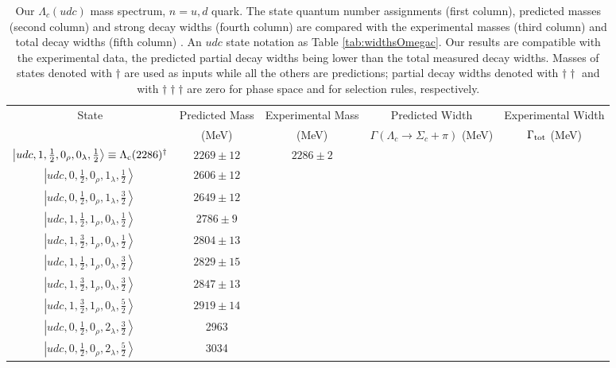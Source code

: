 \documentclass[twocolumn,superscriptaddress,preprintnumbers,nofootinbib]{revtex4}
\begin{document}
\begin{table*}[htbp]
\caption{Our $\Lambda_c (udc)$ mass spectrum, $n=u,d$ quark. The  state quantum number assignments (first column), predicted masses (second column) and strong decay widths (fourth column) are compared with the  experimental  masses (third column) and total decay widths (fifth column) \cite{Aaij:2017nav,Tanabashi:2018oca}. An $udc$ state notation as Table \ref{tab:widthsOmegac}. Our results are compatible with the experimental data, the predicted partial decay widths being lower than the total measured decay widths. Masses of states denoted  with $\dagger$ are used as inputs while all the others
are predictions; partial decay widths denoted with $\dagger  \dagger  $ and with  $\dagger  \dagger  \dagger $  are zero for phase space and for selection rules, respectively. }
\begin{tabular}{ccccc}
\hline
\hline
State & Predicted Mass & Experimental Mass & Predicted Width & Experimental Width\\
         & (MeV)                & (MeV)                      & $\Gamma(\Lambda_c \rightarrow \Sigma_c +\pi)$ (MeV) &  $\Gamma_{\rm tot}$  (MeV) \\
\hline
$\left| udc,1, \frac{1}{2},0_{\rho},0_{\lambda}, \frac{1}{2} \right\rangle \equiv \Lambda_{\rm c}(2286)^{\dagger}$   &  $2269 \pm 12$ & $2286\pm2$ &   &   \\
 $\left| udc,0, \frac{1}{2},0_{\rho},1_{\lambda}, \frac{1}{2} \right\rangle  $ &  $ 2606\pm 12$ &  &  &  \\
  $\left| udc,0, \frac{1}{2},0_{\rho},1_{\lambda}, \frac{3}{2} \right\rangle $ & $2649 \pm 12$ &  &  &  \\
$\left| udc,1, \frac{1}{2},1_{\rho},0_{\lambda}, \frac{1}{2} \right\rangle $   &  $ 2786\pm 9$ &  &  &  \\
$\left| udc,1, \frac{3}{2},1_{\rho},0_{\lambda},  \frac{1}{2} \right\rangle $   &  $2804 \pm 13$   & &   & \\
$\left| udc,1,  \frac{1}{2},1_{\rho},0_{\lambda}, \frac{3}{2} \right\rangle $  &  $2829 \pm 15$ &  &    &  \\
$\left| udc,1, \frac{3}{2},1_{\rho},0_{\lambda}, \frac{3}{2} \right\rangle  $  & $2847\pm13$ &  &  &  \\
$\left| udc,1, \frac{3}{2},1_{\rho},0_{\lambda}, \frac{5}{2} \right\rangle $  & $ 2919\pm14$ &  & & \\
$\left| udc,0, \frac{1}{2},0_{\rho},2_{\lambda}, \frac{3}{2} \right\rangle  $&2963 & & &  \\
$\left| udc,0, \frac{1}{2},0_{\rho},2_{\lambda}, \frac{5}{2} \right\rangle  $&3034 & & &  \\

\end{tabular}
\end{table*}
\end{document}
